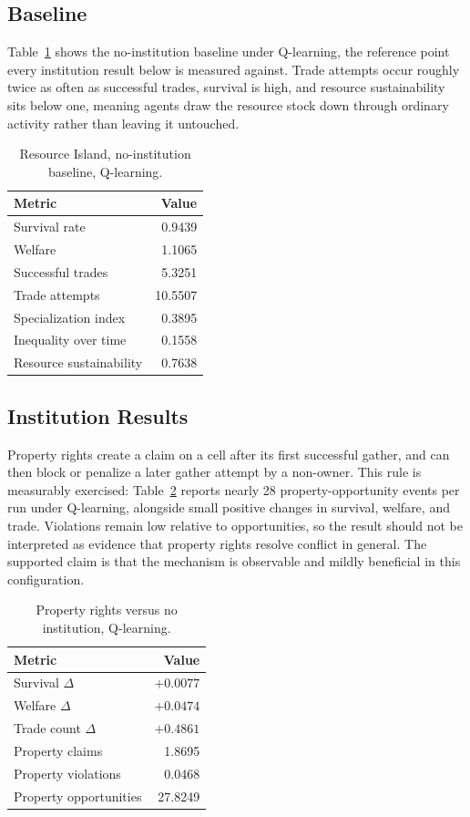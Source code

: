 \documentclass[11pt]{article}
\begin{document}
\subsection{Baseline}

Table~\ref{tab:resource-baseline} shows the no-institution baseline under
Q-learning, the reference point every institution result below is measured
against. Trade attempts occur roughly twice as often as successful trades,
survival is high, and resource sustainability sits below one, meaning agents
draw the resource stock down through ordinary activity rather than leaving it
untouched.

\begin{table}[h]
\centering
\begin{tabular}{lr}
\toprule
Metric & Value \\
\midrule
Survival rate & 0.9439 \\
Welfare & 1.1065 \\
Successful trades & 5.3251 \\
Trade attempts & 10.5507 \\
Specialization index & 0.3895 \\
Inequality over time & 0.1558 \\
Resource sustainability & 0.7638 \\
\bottomrule
\end{tabular}
\caption{Resource Island, no-institution baseline, Q-learning.}
\label{tab:resource-baseline}
\end{table}

\subsection{Institution Results}

Property rights create a claim on a cell after its first successful gather, and
can then block or penalize a later gather attempt by a non-owner. This rule is
measurably exercised: Table~\ref{tab:resource-property} reports nearly
28 property-opportunity events per run under Q-learning, alongside small
positive changes in survival, welfare, and trade. Violations remain low
relative to opportunities, so the result should not be interpreted as evidence
that property rights resolve conflict in general. The supported claim is that
the mechanism is observable and mildly beneficial in this configuration.

\begin{table}[h]
\centering
\begin{tabular}{lr}
\toprule
Metric & Value \\
\midrule
Survival \(\Delta\) & \(+0.0077\) \\
Welfare \(\Delta\) & \(+0.0474\) \\
Trade count \(\Delta\) & \(+0.4861\) \\
Property claims & 1.8695 \\
Property violations & 0.0468 \\
Property opportunities & 27.8249 \\
\bottomrule
\end{tabular}
\caption{Property rights versus no institution, Q-learning.}
\label{tab:resource-property}
\end{table}
\end{document}
